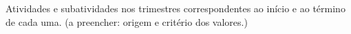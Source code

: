 \documentclass[12pt,a4paper]{article}
\newlength{\colNum}\newlength{\colAtiv}\newlength{\colTri}
\begin{document}
Atividades e subatividades nos trimestres correspondentes ao início e ao término de cada uma. (a preencher: origem e critério dos valores.)

\begingroup
\singlespacing
{}
\setlength{\arrayrulewidth}{0.4pt}
\setlength{\tabcolsep}{3.5pt}
\renewcommand{\arraystretch}{1.4}
\setlength{\colTri}{\dimexpr0.049383\textwidth-2\tabcolsep\relax}
\setlength{\colNum}{\dimexpr0.03155\textwidth-2\tabcolsep\relax}
\setlength{\colAtiv}{\dimexpr\textwidth-\colNum-15\colTri-34\tabcolsep-18\arrayrulewidth\relax}
\newcommand{\vaotri}[1]{\dimexpr #1\dimexpr\colTri+2\tabcolsep+\arrayrulewidth\relax-2\tabcolsep-\arrayrulewidth\relax}
\newcommand{\rotulo}[1]{\multicolumn{2}{|>{\cellcolor{cinzaMedio}}m{\dimexpr\colNum+\colAtiv+2\tabcolsep+\arrayrulewidth\relax}|}{\bfseries #1}}
\end{document}
